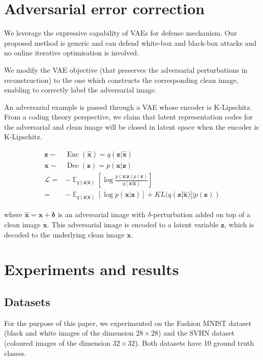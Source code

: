 \documentclass[journal]{IEEEtran}
\newcommand{\bx}{\bm{x}}
\newcommand{\bz}{\bm{z}}
\DeclareMathOperator{\expectation}{\mathbb{E}}
\begin{document}
\section{Adversarial error correction}
We leverage the expressive capability of VAEs for defense mechanism. Our proposed method is generic and can defend white-box and black-box attacks and no online iterative optimisation is involved.

We modify the VAE objective (that preserves the adversarial perturbations in reconstruction) to the one which constructs the corresponding clean image, enabling to correctly label the adversarial image.

An adversarial example is passed through a VAE whose encoder is K-Lipschitz. From a coding theory perspective, we claim that latent representation codes for the adversarial and clean image will be closed in latent space when the encoder is K-Lipschitz. 

\begin{equation}
    \begin{aligned}
        \bz \sim & \operatorname{Enc}(\hat{\bx})=q(\bz | \hat{\bx})
        \\
        \bx \sim & \operatorname{Dec}(\bz)=p(\bx | \bz)
        \\
        \mathcal{L}= & -\expectation_{q(\bz | \hat{\bx})}\left[\log \frac{p(\bx | \bz) p(\bz)}{q(\bz | \hat{\bx})}\right]
        \\
        = & -\expectation_{q(\boldsymbol{z} | \hat{\bx})}[\log p(\bx | \bz)] + KL(q(\bz | \hat{\bx}) || p(\bz))
    \end{aligned}
\end{equation}

where $\hat{\bx} = \bx + \boldsymbol{\delta}$ is an adversarial image with $\delta$-perturbation added on top of a clean image $\bx$. This adversarial
image is encoded to a latent variable $\bz$, which is decoded
to the underlying clean image $\bx$.

\section{Experiments and results}
\subsection{Datasets}
For the purpose of this paper, we experimented on the Fashion MNIST dataset (black and white images of the dimension $28 \times 28$) and the SVHN dataset (coloured images of the dimension $32 \times 32$). Both datasets have 10 ground truth classes.
\end{document}
